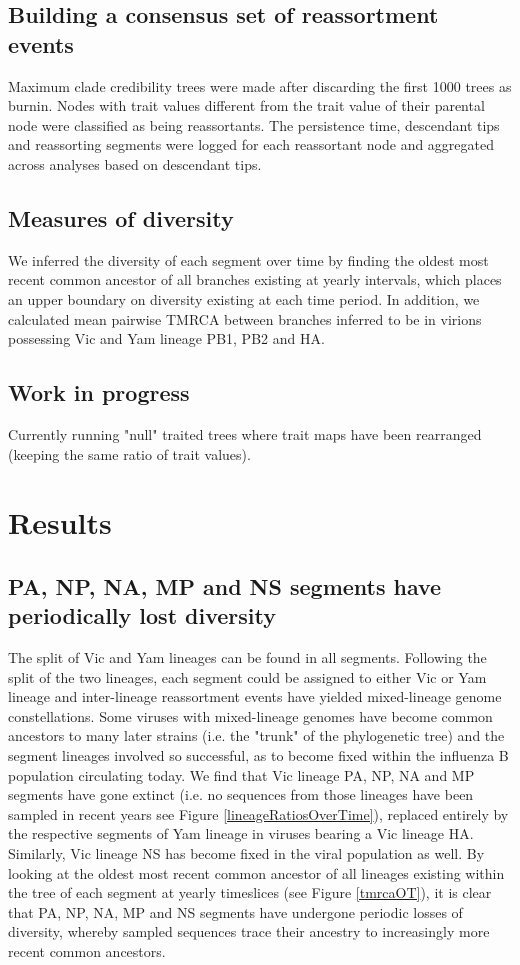 \documentclass[11pt,oneside,letterpaper]{article}
\begin{document}
\subsection*{Building a consensus set of reassortment events}
Maximum clade credibility trees were made after discarding the first 1000 trees as burnin. 
Nodes with trait values different from the trait value of their parental node were classified as being reassortants.
The persistence time, descendant tips and reassorting segments were logged for each reassortant node and aggregated across analyses based on descendant tips.

\subsection*{Measures of diversity}
We inferred the diversity of each segment over time by finding the oldest most recent common ancestor of all branches existing at yearly intervals, which places an upper boundary on diversity existing at each time period.
In addition, we calculated mean pairwise TMRCA between branches inferred to be in virions possessing Vic and Yam lineage PB1, PB2 and HA.


\subsection*{Work in progress}
Currently running "null" traited trees where trait maps have been rearranged (keeping the same ratio of trait values).


\section*{Results}

\subsection*{PA, NP, NA, MP and NS segments have periodically lost diversity}
The split of Vic and Yam lineages can be found in all segments.
Following the split of the two lineages, each segment could be assigned to either Vic or Yam lineage and inter-lineage reassortment events have yielded mixed-lineage genome constellations.
Some viruses with mixed-lineage genomes have become common ancestors to many later strains (i.e. the "trunk" of the phylogenetic tree) and the segment lineages involved so successful, as to become fixed within the influenza B population circulating today.
We find that Vic lineage PA, NP, NA and MP segments have gone extinct (i.e. no sequences from those lineages have been sampled in recent years see Figure \ref{lineageRatiosOverTime}), replaced entirely by the respective segments of Yam lineage in viruses bearing a Vic lineage HA.
Similarly, Vic lineage NS has become fixed in the viral population as well.
By looking at the oldest most recent common ancestor of all lineages existing within the tree of each segment at yearly timeslices (see Figure \ref{tmrcaOT}), it is clear that PA, NP, NA, MP and NS segments have undergone periodic losses of diversity, whereby sampled sequences trace their ancestry to increasingly more recent common ancestors.
\end{document}
